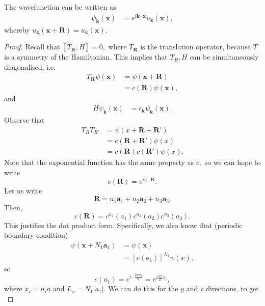 \documentclass{article}
\numberwithin{equation}{section}
\begin{document}
The wavefunction can be written as 
\begin{align}
    \psi_{\bm{k}}(\bm{x}) &= e^{i\bm{k}\cdot \bm{x}} u_{\bm{k}}(\bm{x}),
\end{align}
whereby $u_{\bm{k}}(\bm{x}+\bm{R})=u_{\bm{k}}(\bm{x}).$
\begin{proof}
    Recall that $[T_{\bm{R}},H]=0,$ where $T_{\bm{R}}$ is the translation operator, because $T$ is a symmetry of the Hamiltonian. This implies that $T_R,H$ can be simultaneously diagonalised, i.e.
    \begin{align}
        T_{\bm{R}}\psi(\bm{x}) &= \psi(\bm{x}+\bm{R}) \\ 
        &= c(\bm{R})\psi(\bm{x}),
    \end{align}
    and 
    \begin{align}
        H\psi_{\bm{k}}(\bm{x}) &= \epsilon_{\bm{k}}\psi_{\bm{k}}(\bm{x}).
    \end{align}
    Observe that 
    \begin{align}
        T_RT_{R'} &= \psi(x+\bm{R}+\bm{R'}) \\ 
        &= c(\bm{R}+\bm{R'})\psi(x) \\ 
        &= c(\bm{R})c(\bm{R'})\psi(x).
    \end{align}
    Note that the exponential function has the same property as $c,$ so we can hope to write 
    \begin{equation}
        c(\bm{R}) = e^{i\bm{k}\cdot \bm{R}}.
    \end{equation}
    Let us write 
    \begin{equation}
        \bm{R} = n_1\bm{a}_1+n_2\bm{a}_2+n_3\bm{a}_3.
    \end{equation}
    Then,
    \begin{equation}
        c(\bm{R})=c^{n_1}(a_1)c^{n_2}(a_2)c^{n_3}(a_3).
    \end{equation}
    This justifies the dot product form. Specifically, we also know that (periodic boundary condition)
    \begin{align}
        \psi(\bm{x}+N_1\bm{a}_1) &= \psi(\bm{x}) \\ 
        &= [c(a_1)]^{N_1}\psi(x),
    \end{align}
    so 
    \begin{equation}
        c(a_1) = e^{ i \cdot \frac{2\pi n_1}{N_1}} = e^{i\frac{2\pi}{L}x_i},
    \end{equation}
    where $x_i=n_ia$ and $L_x=N_1|a_1|.$ We can do this for the $y$ and $z$ directions, to get 
    \begin{equation}

\end{equation}
\end{proof}
\end{document}
